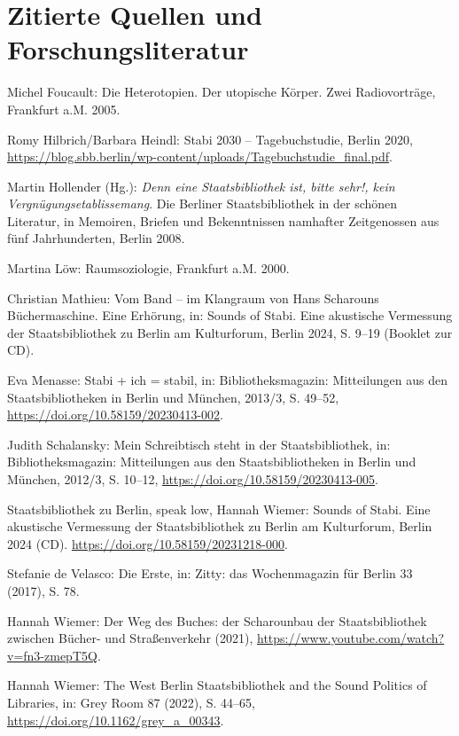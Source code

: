 \documentclass[a4paper,
fontsize=11pt,
oneside,
numbers=noperiodatend,
parskip=half-,
bibliography=totoc,
final
]{scrartcl}
\begin{document}
\hypertarget{zitierte-quellen-und-forschungsliteratur}{%
\section{Zitierte Quellen und
Forschungsliteratur}\label{zitierte-quellen-und-forschungsliteratur}}

Michel Foucault: Die Heterotopien. Der utopische Körper. Zwei
Radiovorträge, Frankfurt a.M. 2005.

Romy Hilbrich/Barbara Heindl: Stabi 2030 -- Tagebuchstudie, Berlin
2020,
\url{https://blog.sbb.berlin/wp-content/uploads/Tagebuchstudie_final.pdf}.

Martin Hollender (Hg.): \emph{Denn eine Staatsbibliothek ist, bitte
sehr!, kein Vergnügungsetablissemang}. Die Berliner Staatsbibliothek in
der schönen Literatur, in Memoiren, Briefen und Bekenntnissen namhafter
Zeitgenossen aus fünf Jahrhunderten, Berlin 2008.

Martina Löw: Raumsoziologie, Frankfurt a.M. 2000.

Christian Mathieu: Vom Band -- im Klangraum von Hans Scharouns
Büchermaschine. Eine Erhörung, in: Sounds of Stabi. Eine akustische
Vermessung der Staatsbibliothek zu Berlin am Kulturforum, Berlin 2024,
S. 9--19 (Booklet zur CD).

Eva Menasse: Stabi + ich = stabil, in: Bibliotheksmagazin:
Mitteilungen aus den Staatsbibliotheken in Berlin und München, 2013/3,
S. 49--52, \url{https://doi.org/10.58159/20230413-002}.

Judith Schalansky: Mein Schreibtisch steht in der Staatsbibliothek,
in: Bibliotheksmagazin: Mitteilungen aus den Staatsbibliotheken in
Berlin und München, 2012/3, S. 10--12,
\url{https://doi.org/10.58159/20230413-005}.

Staatsbibliothek zu Berlin, speak low, Hannah Wiemer: Sounds of Stabi. Eine akustische Vermessung der Staatsbibliothek zu Berlin am Kulturforum, Berlin 2024 (CD). \url{https://doi.org/10.58159/20231218-000}.

Stefanie de Velasco: Die Erste, in: Zitty: das Wochenmagazin für
Berlin 33 (2017), S. 78.

Hannah Wiemer: Der Weg des Buches: der Scharounbau der
Staatsbibliothek zwischen Bücher- und Straßenverkehr (2021),
\url{https://www.youtube.com/watch?v=fn3-zmepT5Q}.

Hannah Wiemer: The West Berlin Staatsbibliothek and the Sound
Politics of Libraries, in: Grey Room 87 (2022), S. 44--65,
\url{https://doi.org/10.1162/grey_a_00343}.
\end{document}
